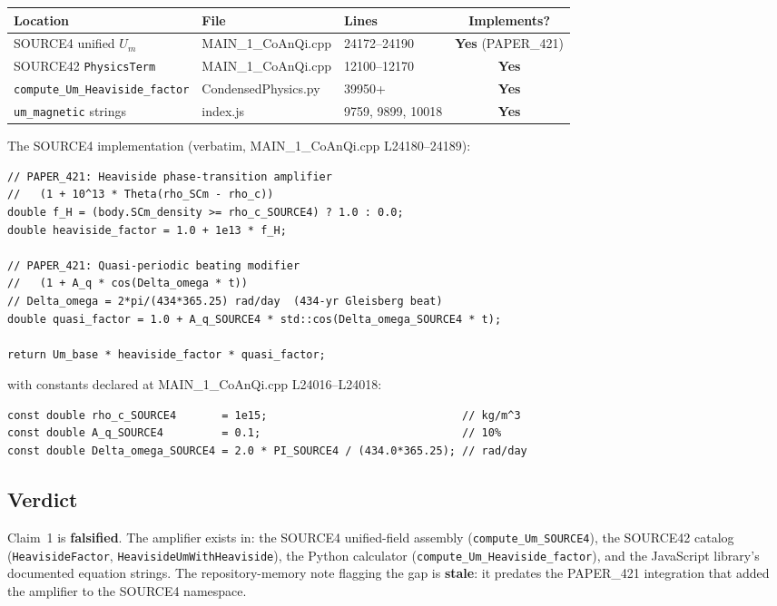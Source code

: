 \documentclass[11pt]{article}
\begin{document}
\begin{center}
\begin{tabular}{lllc}
\toprule
\textbf{Location} & \textbf{File} & \textbf{Lines} & \textbf{Implements?} \\
\midrule
SOURCE4 unified $U_m$        & MAIN\_1\_CoAnQi.cpp & 24172--24190 & \textbf{Yes} (PAPER\_421) \\
SOURCE42 \texttt{PhysicsTerm}& MAIN\_1\_CoAnQi.cpp & 12100--12170 & \textbf{Yes} \\
\texttt{compute\_Um\_Heaviside\_factor} & CondensedPhysics.py & 39950+ & \textbf{Yes} \\
\texttt{um\_magnetic} strings & index.js & 9759, 9899, 10018 & \textbf{Yes} \\
\bottomrule
\end{tabular}
\end{center}

The SOURCE4 implementation (verbatim, MAIN\_1\_CoAnQi.cpp L24180--24189):

\begin{lstlisting}
// PAPER_421: Heaviside phase-transition amplifier
//   (1 + 10^13 * Theta(rho_SCm - rho_c))
double f_H = (body.SCm_density >= rho_c_SOURCE4) ? 1.0 : 0.0;
double heaviside_factor = 1.0 + 1e13 * f_H;

// PAPER_421: Quasi-periodic beating modifier
//   (1 + A_q * cos(Delta_omega * t))
// Delta_omega = 2*pi/(434*365.25) rad/day  (434-yr Gleisberg beat)
double quasi_factor = 1.0 + A_q_SOURCE4 * std::cos(Delta_omega_SOURCE4 * t);

return Um_base * heaviside_factor * quasi_factor;
\end{lstlisting}

\noindent with constants declared at MAIN\_1\_CoAnQi.cpp L24016--L24018:

\begin{lstlisting}
const double rho_c_SOURCE4       = 1e15;                              // kg/m^3
const double A_q_SOURCE4         = 0.1;                               // 10%
const double Delta_omega_SOURCE4 = 2.0 * PI_SOURCE4 / (434.0*365.25); // rad/day
\end{lstlisting}

\subsection{Verdict}

Claim~1 is \textbf{falsified}. The amplifier exists in:
the SOURCE4 unified-field assembly (\verb|compute_Um_SOURCE4|),
the SOURCE42 catalog (\verb|HeavisideFactor|,
\verb|HeavisideUmWithHeaviside|), the Python calculator
(\verb|compute_Um_Heaviside_factor|), and the JavaScript library's
documented equation strings. The repository-memory note flagging
the gap is \textbf{stale}: it predates the PAPER\_421 integration
that added the amplifier to the SOURCE4 namespace.
\end{document}
